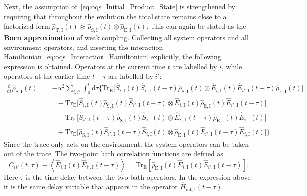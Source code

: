 Next, the assumption of~\autoref{eq:oqs_Initial_Product_State} is strengthened by requiring that throughout the evolution the total state remains close to a factorized form $\hat{\rho}_{\mathrm{T},\mathrm{I}}(t) \approx \hat{\rho}_{\mathrm{S},\mathrm{I}}(t) \otimes \hat{\rho}_{\mathrm{E},\mathrm{I}}(t)$. This can again be stated as the \textbf{Born approximation} of weak coupling.
Collecting all system operators and all environment operators, and inserting the interaction Hamiltonian~\autoref{eq:oqs_Interaction_Hamiltonian} explicitly, the following expression is obtained. Operators at the current time \(t\) are labelled by \(i\), while operators at the earlier time \(t-\tau\) are labelled by \(i'\):
\begin{align*}
	\frac{\mathrm{d}}{\mathrm{d}t}\hat{\rho}_{\mathrm{S},\mathrm{I}}(t)
	&= -\alpha^2  \sum_{i, i'} \int_0^t\!\mathrm{d}\tau
	\bigg\{
	\mathrm{Tr}_{\mathrm{E}} \big[
	\hat{S}_{i,\mathrm{I}}(t)
	\hat{S}_{i',\mathrm{I}}(t-\tau)
	\hat{\rho}_{\mathrm{S},\mathrm{I}}(t)
	\otimes
	\hat{E}_{i,\mathrm{I}}(t)
	\hat{E}_{i',\mathrm{I}}(t-\tau)
	\hat{\rho}_{\mathrm{E},\mathrm{I}}(t)
	\big] \\
	&\qquad
	-
	\mathrm{Tr}_{\mathrm{E}} \big[
	\hat{S}_{i,\mathrm{I}}(t)
	\hat{\rho}_{\mathrm{S},\mathrm{I}}(t)
	\hat{S}_{i',\mathrm{I}}(t-\tau)
	\otimes
	\hat{E}_{i,\mathrm{I}}(t)
	\hat{\rho}_{\mathrm{E},\mathrm{I}}(t)
	\hat{E}_{i',\mathrm{I}}(t-\tau)
	\big] \\
	&\qquad
	-
	\mathrm{Tr}_{\mathrm{E}} \big[
	\hat{S}_{i',\mathrm{I}}(t-\tau)
	\hat{\rho}_{\mathrm{S},\mathrm{I}}(t)
	\hat{S}_{i,\mathrm{I}}(t)
	\otimes
	\hat{E}_{i',\mathrm{I}}(t-\tau)
	\hat{\rho}_{\mathrm{E},\mathrm{I}}(t)
	\hat{E}_{i,\mathrm{I}}(t)
	\big] \\
	&\qquad
	+
	\mathrm{Tr}_{\mathrm{E}} \big[
	\hat{\rho}_{\mathrm{S},\mathrm{I}}(t)
	\hat{S}_{i',\mathrm{I}}(t-\tau)
	\hat{S}_{i,\mathrm{I}}(t)
	\otimes
	\hat{\rho}_{\mathrm{E},\mathrm{I}}(t)
	\hat{E}_{i',\mathrm{I}}(t-\tau)
	\hat{E}_{i,\mathrm{I}}(t)
	\big]
	\bigg\}.
\end{align*}
Since the trace only acts on the environment, the system operators can be taken out of the trace. The two-point bath correlation functions are defined as
\begin{equation}
	C_{ii'}(t,\tau)
	\equiv
	\left\langle
	\hat{E}_{i,\mathrm{I}}(t)
	\hat{E}_{i',\mathrm{I}}(t-\tau)
	\right\rangle
	=
	\mathrm{Tr}_{\mathrm{E}}\!\left[
	\hat{\rho}_{\mathrm{E},\mathrm{I}}(t)
	\hat{E}_{i,\mathrm{I}}(t)
	\hat{E}_{i',\mathrm{I}}(t-\tau)
	\right].
	\label{eq:oqs_Environment_Correlation_Function}
\end{equation}
Here \(\tau\) is the time delay between the two bath operators. In the expression above it is the same delay variable that appears in the operator \(\hat{H}_{\mathrm{int},\mathrm{I}}(t-\tau)\).

